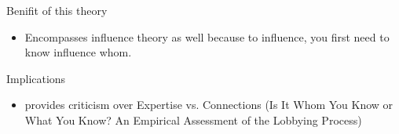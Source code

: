 \documentclass{beamer}
\begin{document}
	\begin{frame}{Benifit of this theory}
		\begin{itemize}
			\item Encompasses influence theory as well because to influence, you first need to know influence whom.
		\end{itemize}
	\end{frame}


	\begin{frame}{Implications}
		\begin{itemize}
			\item provides criticism over Expertise vs. Connections (Is It Whom You Know or What You Know?
			An Empirical Assessment of the Lobbying Process)
		\end{itemize}
	\end{frame}
\end{document}
